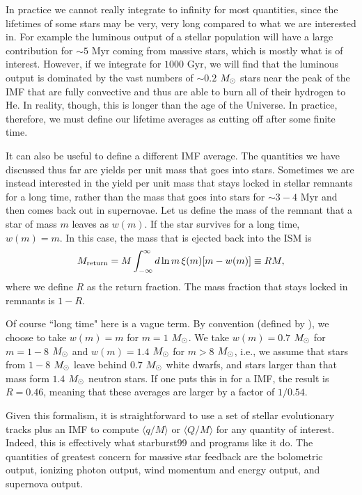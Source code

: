 In practice we cannot really integrate to infinity for most quantities, since the lifetimes of some stars may be very, very long compared to what we are interested in. For example the luminous output of a stellar population will have a large contribution for $\sim 5$ Myr coming from massive stars, which is mostly what is of interest. However, if we integrate for $1000$ Gyr, we will find that the luminous output is dominated by the vast numbers of $\sim 0.2$ $M_{\odot}$ stars near the peak of the IMF that are fully convective and thus are able to burn all of their hydrogen to He. In reality, though, this is longer than the age of the Universe. In practice, therefore, we must define our lifetime averages as cutting off after some finite time.

It can also be useful to define a different IMF average. The quantities we have discussed thus far are yields per unit mass that goes into stars. Sometimes we are instead interested in the yield per unit mass that stays locked in stellar remnants for a long time, rather than the mass that goes into stars for $\sim 3-4$ Myr and then comes back out in supernovae. Let us define the mass of the remnant that a star of mass $m$ leaves as $w(m)$. If the star survives for a long time, $w(m) = m$. In this case, the mass that is ejected back into the ISM is
\begin{equation}
M_{\rm return} = M \int_{-\infty}^{\infty} d\ln m \, \xi(m) [m - w(m)] \equiv R M,
\end{equation}
where we define $R$ as the return fraction. The mass fraction that stays locked in remnants is $1-R$.

Of course ``long time" here is a vague term. By convention (defined by \citealt{tinsley80a}), we choose to take $w(m) = m$ for $m=1$ $M_{\odot}$. We take $w(m) = 0.7$ $M_{\odot}$ for $m=1-8$ $M_{\odot}$ and $w(m) = 1.4$ $M_{\odot}$ for $m>8$ $M_{\odot}$, i.e., we assume that stars from $1-8$ $M_{\odot}$ leave behind $0.7$ $M_{\odot}$ white dwarfs, and stars larger than that mass form $1.4$ $M_{\odot}$ neutron stars. If one puts this in for a \citet{chabrier05a} IMF, the result is $R=0.46$, meaning that these averages are larger by a factor of $1/0.54$.

Given this formalism, it is straightforward to use a set of stellar evolutionary tracks plus an IMF to compute $\langle q/M\rangle$ or $\langle Q/M\rangle$ for any quantity of interest. Indeed, this is effectively what starburst99 \citep{leitherer99a} and programs like it do. The quantities of greatest concern for massive star feedback are the bolometric output, ionizing photon output, wind momentum and energy output, and supernova output.

